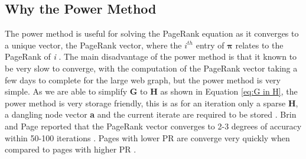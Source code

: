 \subsection{Why the Power Method}\label{sec:why power}

The power method is useful for solving the PageRank equation as it converges to a unique vector, the PageRank vector, where the $i^{th}$ entry of $\boldsymbol\pi$ relates to the PageRank of \textit{i} \cite{ipsen2005analysis}. The main disadvantage of the power method is that it known to be very slow to converge, with the computation of the PageRank vector taking a few days to complete for the large web graph, but the power method is very simple. As we are able to simplify \textbf{G} to \textbf{H} as shown in Equation \eqref{eq:G in H}, the power method is very storage friendly, this is as for an iteration only a sparse \textbf{H}, a dangling node vector \textbf{a} and the current iterate are required to be stored \cite{langville}. Brin and Page reported that the PageRank vector converges to 2-3 degrees of accuracy within 50-100 iterations \cite{austin}. Pages with lower PR are converge very quickly when compared to pages with higher PR \cite{thorson2004modeling}.